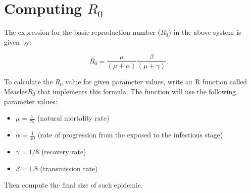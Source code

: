 \documentclass{article}
\begin{document}
\section{Computing $R_0$}
The expression for the basic reproduction number ($R_0$) in the above system  is given by:

\begin{equation*} R_0 = \frac{\mu}{(\mu + \alpha)} \frac{\beta}{(\mu + \gamma)}. \end{equation*}

To calculate the $R_0$ value for given parameter values,  write an R function 
called Measles$R_0$ that implements this formula. The function will use the following parameter values:

    \begin{itemize}
        \item $\mu = \frac{1}{75}$ (natural mortality rate)
        \item $\alpha = \frac{1}{10}$ (rate of progression from the exposed to the infectious stage)
        \item $\gamma = 1/8$ (recovery rate)
        \item $\beta = 1.8$ (transmission rate)
    \end{itemize}
Then compute the final size of such epidemic.
\end{document}
